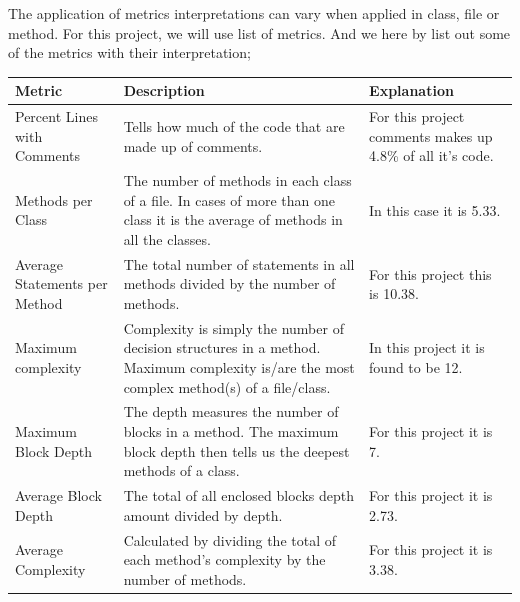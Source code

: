 \documentclass[UKenglish]{article}  %
\begin{document}
The application of metrics interpretations can vary when applied in class, file
or method. For this project, we will use list of metrics. And we here by list
out some of the metrics with their interpretation;

\begin{longtable}[H]{| m{1in} |  m{2in} | m{2in} |}
	\hline
	\textbf{Metric} & \textbf{Description} & \textbf{Explanation}\\
	\hline Percent Lines with Comments & Tells how much of the code that
	are made up of comments. & For this project comments makes up 4.8\% of
	all it's code.\\
	\hline Methods per Class & The number of methods in each class of a
	file. In cases of more than one class it is the average of methods in
	all the classes. & In this case it is 5.33.\\
	\hline Average Statements per Method & The total number of statements
	in all methods divided by the number of methods. & For this project this
	is 10.38.\\
	\hline Maximum complexity & Complexity is simply the number of decision
	structures in a method. Maximum complexity is/are the most complex
	method(s) of a file/class. & In this project it is found to be 12.\\
	\hline Maximum Block Depth & The depth measures the number of blocks
	in a method. The maximum block depth then tells us the deepest methods
	of a class. & For this project it is 7.\\
	\hline Average Block Depth & The total of all enclosed blocks depth amount
	divided by depth. & For this project it is 2.73.\\
	\hline Average Complexity & Calculated by dividing the total of each
	method’s complexity by the number of methods. & For this project it is
	3.38.\\
	\hline
\end{longtable}
\end{document}
